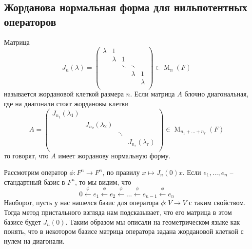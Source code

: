 \subsection{Жорданова нормальная форма для нильпотентных операторов}

\begin{definition}
\label{def::JNF}
Матрица 
\[
J_n(\lambda) = 
\begin{pmatrix}
{\lambda}&{1}&{}&{}&{}\\
{}&{\lambda}&{1}&{}&{}\\
{}&{}&{\ddots}&{\ddots}&{}\\
{}&{}&{}&{\lambda}&{1}\\
{}&{}&{}&{}&{\lambda}\\
\end{pmatrix}
\in \operatorname{M}_n(F)
\]
называется жордановой клеткой размера $n$.
Если матрица $A$ блочно диагональная, где на диагонали стоят жордановы клетки
\[
A = 
\begin{pmatrix}
{J_{n_1}(\lambda_1)}&{}&{}&{}\\
{}&{J_{n_2}(\lambda_2)}&{}&{}\\
{}&{}&{\ddots}&{}\\
{}&{}&{}&{J_{n_r}(\lambda_r)}\\
\end{pmatrix}
\in \operatorname{M}_{n_1 + \ldots + n_r}(F)
\]
то говорят, что $A$ имеет жорданову нормальную форму.
\end{definition}

Рассмотрим оператор $\phi\colon F^n \to F^n$, по правилу $x\mapsto J_n(0)x$.
Если $e_1, \ldots ,e_n$ -- стандартный базис в $F^n$, то мы видим, что 
\[
0\stackrel{\phi}{\longleftarrow}e_1\stackrel{\phi}{\longleftarrow}e_2 \stackrel{\phi}{\longleftarrow}\ldots\stackrel{\phi}{\longleftarrow}e_{n-1}\stackrel{\phi}{\longleftarrow}e_n
\]
Наоборот, пусть у нас нашелся базис для оператора $\phi\colon V\to V$ с таким свойством.
Тогда метод пристального взгляда нам подсказывает, что его матрица в этом базисе будет $J_n(0)$.
Таким образом мы описали на геометрическом языке как понять, что в некотором базисе матрица оператора задана жордановой клеткой с нулем на диагонали.

